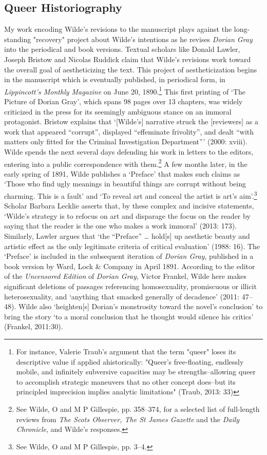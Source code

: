 \documentclass[11pt]{article}
\begin{document}
\subsection{Queer Historiography}
\label{sec:org8719a9b}
My work encoding Wilde's revisions to the manuscript plays against the
long-standing "recovery" project about Wilde's intentions as he
revises \emph{Dorian Gray} into the periodical and book versions. Textual
scholars like Donald Lawler, Joseph Bristow and Nicolas Ruddick claim
that Wilde's revisions work toward the overall goal of aestheticizing
the text. This project of aestheticization begins in the manuscript
which is eventually published, in periodical form, in \emph{Lippincott's
Monthly Magazine} on June 20, 1890.\footnote{For instance, Valerie Traub's argument that the term "queer"
loses its descriptive value if applied ahistorically: "Queer's
free-floating, endlessly mobile, and infinitely subversive capacities
may be strengths--allowing queer to accomplish strategic maneuvers
that no other concept does--but its principled imprecision implies
analytic limitations" (Traub, 2013: 33)} This first printing of ‘The
Picture of Dorian Gray', which spans 98 pages over 13 chapters, was
widely criticized in the press for its seemingly ambiguous stance on
an immoral protagonist. Bristow explains that ‘[Wilde's] narrative
struck the [reviewers] as a work that appeared “corrupt”, displayed
“effeminate frivolity”, and dealt “with matters only fitted for the
Criminal Investigation Department”' (2000: xviii). Wilde spends the
next several days defending his work in letters to the editors,
entering into a public correspondence with them.\footnote{See Wilde, O and M P Gillespie, pp. 358--374, for a selected list of
full-length reviews from \emph{The Scots Observer, The St James Gazette} and
the \emph{Daily Chronicle}, and Wilde's responses.} A few months
later, in the early spring of 1891, Wilde publishes a ‘Preface' that
makes such claims as ‘Those who find ugly meanings in beautiful things
are corrupt without being charming. This is a fault' and ‘To reveal
art and conceal the artist is art's aim'.\footnote{See Wilde, O and M P Gillespie, pp. 3--4.} Scholar Barbara
Lecklie asserts that, by these complex and incisive statements,
‘Wilde's strategy is to refocus on art and disparage the focus on the
reader by saying that the reader is the one who makes a work immoral'
(2013: 173). Similarly, Lawler argues that ‘the “Preface” \ldots{} hold[s]
up aesthetic beauty and artistic effect as the only legitimate
criteria of critical evaluation' (1988: 16). The ‘Preface' is included
in the subsequent iteration of \emph{Dorian Gray}, published in a book
version by Ward, Lock \& Company in April 1891. According to the editor
of the \emph{Uncensored Edition} of \emph{Dorian Gray}, Victor Frankel, Wilde
here makes significant deletions of passages referencing
homosexuality, promiscuous or illicit heterosexuality, and ‘anything
that smacked generally of decadence' (2011: 47--48). Wilde also
‘heighten[s] Dorian's monstrosity toward the novel's conclusion' to
bring the story ‘to a moral conclusion that he thought would silence
his critics' (Frankel, 2011:30).
\end{document}
